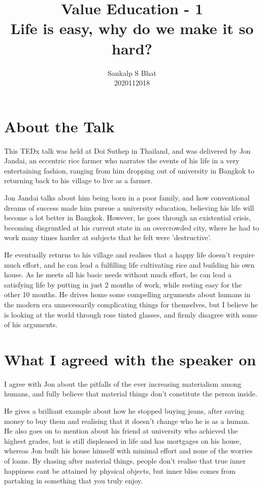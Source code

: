 \documentclass[a4paper, 12pt]{extarticle}
\title{Value Education - 1\\
Life is easy, why do we make it so hard?}
\author{Sankalp S Bhat\\
2020112018
}
\begin{document}
\maketitle
\thispagestyle{empty}

\section*{About the Talk}
This TEDx talk was held at Doi Suthep in Thailand, and was delivered by Jon Jandai, an eccentric rice farmer who narrates the events of his life in a very entertaining fashion, ranging from him dropping out of university in Bangkok to returning back to his village to live as a farmer.

Jon Jandai talks about him being born in a poor family, and how conventional dreams of success made him pursue a university education, believing his life will become a lot better in Bangkok. However, he goes through an existential crisis, becoming disgruntled at his current state in an overcrowded city, where he had to work many times harder at subjects that he felt were 'destructive'.

He eventually returns to his village and realises that a happy life doesn't require much effort, and he can lead a fulfilling life cultivating rice and building his own house. As he meets all his basic needs without much effort, he can lead a satisfying life by putting in just 2 months of work, while resting easy for the other 10 months. He drives home some compelling arguments about humans in the modern era unnecessarily complicating things for themselves, but I believe he is looking at the world through rose tinted glasses, and firmly disagree with some of his arguments. 
      
\section*{What I agreed with the speaker on}

I agree with Jon about the pitfalls of the ever increasing materialism among humans, and fully believe that material things don't constitute the person inside.

He gives a brilliant example about how he stopped buying jeans, after saving money to buy them and realising that it doesn't change who he is as a human. He also goes on to mention about his friend at university who achieved the highest grades, but is still displeased in life and has mortgages on his house, whereas Jon built his house himself with minimal effort and none of the worries of loans. By chasing after material things, people don't realise that true inner happiness cant be attained by physical objects, but inner bliss comes from partaking in something that you truly enjoy. 
\end{document}
